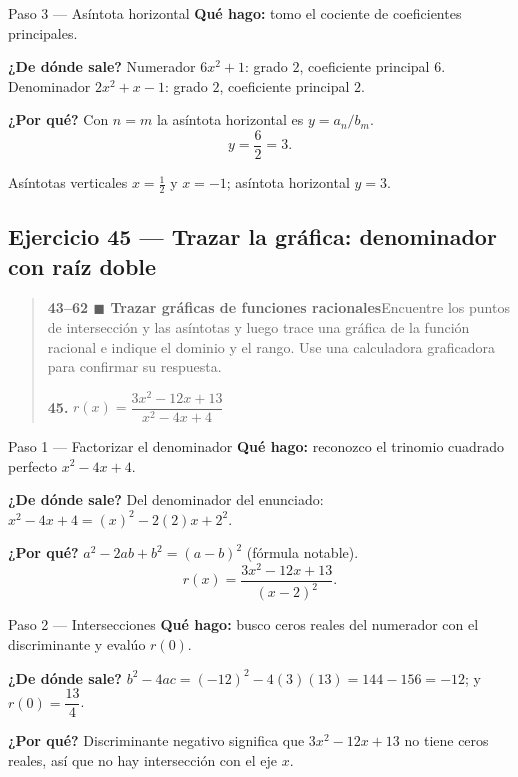 \documentclass[11pt]{article}
\begin{document}
\begin{paso}{Paso 3 --- Asíntota horizontal}
\textbf{Qué hago:} tomo el cociente de coeficientes principales.

\textbf{¿De dónde sale?} Numerador $6x^2+1$: grado $2$, coeficiente principal $6$. Denominador $2x^2+x-1$: grado $2$, coeficiente principal $2$.

\textbf{¿Por qué?} Con $n=m$ la asíntota horizontal es $y=a_n/b_m$.
\[
y=\frac{6}{2}=3 .
\]
\end{paso}

\begin{resp}
Asíntotas verticales $x=\tfrac12$ y $x=-1$; asíntota horizontal $y=3$.
\end{resp}

\subsection*{Ejercicio 45 — Trazar la gráfica: denominador con raíz doble}

\begin{quote}
\textbf{43--62 $\blacksquare$ Trazar gráficas de funciones racionales}\quad Encuentre los puntos de intersección y las asíntotas y luego trace una gráfica de la función racional e indique el dominio y el rango. Use una calculadora graficadora para confirmar su respuesta.

\textbf{45.} $r(x)=\dfrac{3x^2-12x+13}{x^2-4x+4}$
\end{quote}

\begin{paso}{Paso 1 --- Factorizar el denominador}
\textbf{Qué hago:} reconozco el trinomio cuadrado perfecto $x^2-4x+4$.

\textbf{¿De dónde sale?} Del denominador del enunciado: $x^2-4x+4=(x)^2-2(2)x+2^2$.

\textbf{¿Por qué?} $a^2-2ab+b^2=(a-b)^2$ (fórmula notable).
\[
r(x)=\frac{3x^2-12x+13}{(x-2)^2}.
\]
\end{paso}

\begin{paso}{Paso 2 --- Intersecciones}
\textbf{Qué hago:} busco ceros reales del numerador con el discriminante y evalúo $r(0)$.

\textbf{¿De dónde sale?} $b^2-4ac=(-12)^2-4(3)(13)=144-156=-12$; y $r(0)=\dfrac{13}{4}$.

\textbf{¿Por qué?} Discriminante negativo significa que $3x^2-12x+13$ no tiene ceros reales, así que no hay intersección con el eje $x$.
\end{paso}
\end{document}
